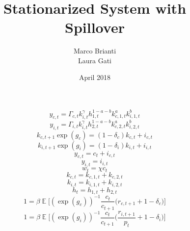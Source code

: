 \documentclass{article}
\title{Stationarized System with Spillover}
\author{Marco Brianti\\Laura Gati}
\date{April 2018}
\DeclareMathOperator{\E}{\mathbb{E}}
\begin{document}
	
	\maketitle

\Large{
	

\begin{equation}\label{eq:prodfuncfinal}
y_{c,t} = \Gamma_{c,t} k_{i,t}^{\gamma} h_{1,t}^{1 - a- b} k_{c,1,t}^a k_{i,1,t}^b
\end{equation}
\begin{equation}\label{eq:prodfuncinter}
y_{i,t} = \Gamma_{i,t} k_{i,t}^{\gamma} h_{2,t}^{1 - a- b} k_{c,2,t}^a k_{i,2,t}^b
\end{equation}
\begin{equation}\label{eq:LOMfinal}
k_{c,t+1} \exp{(g_c)} = (1 - \delta_c)k_{c,t} + i_{c,t}
\end{equation}
\begin{equation}\label{eq:LOMinter}
k_{i,t+1} \exp{(g_i)} = (1 - \delta_i)k_{i,t} + i_{i,t}
\end{equation}
\begin{equation}\label{eq:resourcefinal}
y_{c,t} = c_{t} + i_{c,t}
\end{equation}
\begin{equation}\label{eq:resourceinter}
y_{i,t} = i_{i,t}
\end{equation}
\begin{equation}\label{eq:intratEE}
w_{t} = \chi c_{t}
\end{equation}
\begin{equation}\label{eq:hardKconstr}
k_{c,t} = k_{c,1,t} + k_{c,2,t}
\end{equation}
\begin{equation}\label{eq:softKconstr}
k_{i,t} = k_{i,1,t} + k_{i,2,t}
\end{equation}
\begin{equation}\label{eq:hoursconstr}
h_{t} = h_{1,t} + h_{2,t}
\end{equation}
\begin{equation}\label{eq:intertEEhard}
1 = \beta \E \bigg[ (\exp{(g_c)})^{-1} \frac{c_{t}}{c_{t+1}} \bigg( r_{c,t+1} + 1 - \delta_c   \bigg)     \bigg]
\end{equation}
\begin{equation}\label{eq:intertEEsoft}
1 = \beta \E \bigg[ (\exp{(g_i)})^{-1} \frac{c_{t}}{c_{t+1}} \bigg( \frac{r_{i,t+1}}{p_t} + 1 - \delta_i  \bigg)     \bigg]
\end{equation}
\begin{equation}\label{eq:FOClaborfinal}

\end{equation}}
\end{document}
